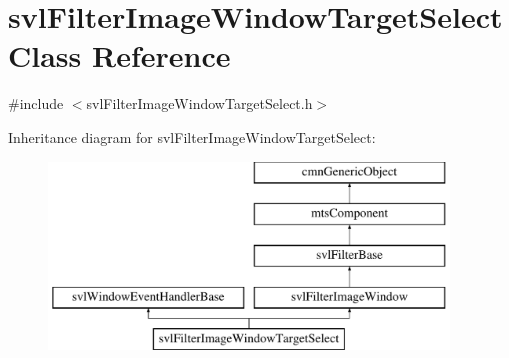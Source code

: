 \hypertarget{classsvl_filter_image_window_target_select}{}\section{svl\+Filter\+Image\+Window\+Target\+Select Class Reference}
\label{classsvl_filter_image_window_target_select}


{\ttfamily \#include $<$svl\+Filter\+Image\+Window\+Target\+Select.\+h$>$}

Inheritance diagram for svl\+Filter\+Image\+Window\+Target\+Select\+:\begin{figure}[H]
\begin{center}
\leavevmode
\includegraphics[height=5.000000cm]{d7/dd6/classsvl_filter_image_window_target_select}
\end{center}
\end{figure}
